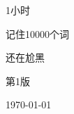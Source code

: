\begin{titlepage}
    \centering
    \vspace*{0.5cm}
    
    {\fontsize{80}{80}\selectfont\songti 1小时 \par}
    \vspace{0.1cm} %
    
    {\fontsize{65}{65}\selectfont\songti 记住10000个词 \par}
    \vspace{1cm} %
    
    {\Large {} 还在尬黑 \par}
    \vspace{0.1cm}
    
    {\Large {} 第1版 \par}
    \vspace{0.1cm}
    
    {\Large {} \today \par}
    \vspace{0.1cm}

\end{titlepage}